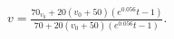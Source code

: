 $v=\frac{70_{v_{0}}+20\left(v_{0}+50\right)\left(e^0.056t-1\right)}
{70+20\left(v_{0}+50\right)\left(e^0.056t-1\right)}$.
